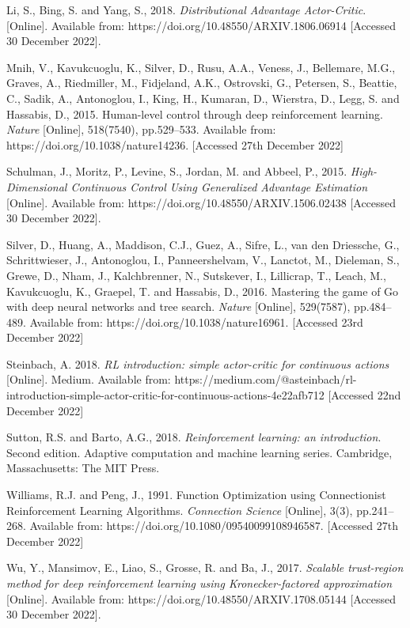\documentclass{article}
\begin{document}
Li, S., Bing, S. and Yang, S., 2018. \emph{Distributional Advantage Actor-Critic}. [Online]. Available from: https://doi.org/10.48550/ARXIV.1806.06914 [Accessed 30 December 2022].

Mnih, V., Kavukcuoglu, K., Silver, D., Rusu, A.A., Veness, J., Bellemare, M.G., Graves, A., Riedmiller, M., Fidjeland, A.K., Ostrovski, G., Petersen, S., Beattie, C., Sadik, A., Antonoglou, I., King, H., Kumaran, D., Wierstra, D., Legg, S. and Hassabis, D., 2015. Human-level control through deep reinforcement learning. \emph{Nature} [Online], 518(7540), pp.529–533. Available from: https://doi.org/10.1038/nature14236. [Accessed 27th December 2022]

Schulman, J., Moritz, P., Levine, S., Jordan, M. and Abbeel, P., 2015. \emph{High-Dimensional Continuous Control Using Generalized Advantage Estimation}  [Online]. Available from: https://doi.org/10.48550/ARXIV.1506.02438 [Accessed 30 December 2022].

Silver, D., Huang, A., Maddison, C.J., Guez, A., Sifre, L., van den Driessche, G., Schrittwieser, J., Antonoglou, I., Panneershelvam, V., Lanctot, M., Dieleman, S., Grewe, D., Nham, J., Kalchbrenner, N., Sutskever, I., Lillicrap, T., Leach, M., Kavukcuoglu, K., Graepel, T. and Hassabis, D., 2016. Mastering the game of Go with deep neural networks and tree search. \emph{Nature} [Online], 529(7587), pp.484–489. Available from: https://doi.org/10.1038/nature16961. [Accessed 23rd December 2022]

Steinbach, A. 2018. \emph{RL introduction: simple actor-critic for continuous actions} [Online]. Medium. Available from: https://medium.com/@asteinbach/rl-introduction-simple-actor-critic-for-continuous-actions-4e22afb712 [Accessed 22nd December 2022]

Sutton, R.S. and Barto, A.G., 2018. \emph{Reinforcement learning: an introduction}. Second edition. Adaptive computation and machine learning series. Cambridge, Massachusetts: The MIT Press.

Williams, R.J. and Peng, J., 1991. Function Optimization using Connectionist Reinforcement Learning Algorithms. \emph{Connection Science} [Online], 3(3), pp.241–268. Available from: https://doi.org/10.1080/09540099108946587. [Accessed 27th December 2022]

Wu, Y., Mansimov, E., Liao, S., Grosse, R. and Ba, J., 2017. \emph{Scalable trust-region method for deep reinforcement learning using Kronecker-factored approximation} [Online]. Available from: https://doi.org/10.48550/ARXIV.1708.05144 [Accessed 30 December 2022].
\end{document}

